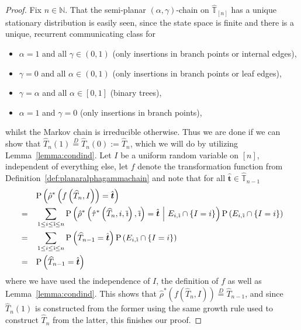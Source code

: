 \documentclass[a4paper, final]{amsart}
\theoremstyle{plain}
\theoremstyle{definition}
\newcommand{\tree}[1][t]{\boldsymbol{#1}}
\newcommand{\That}[1][T]{\widehat{#1}}
\newcommand{\Thatspace}[1][\T]{\widehat{\boldsymbol{#1}}} %
\newcommand{\T}{\mathbb{T}}
\DeclareMathOperator{\tildei}{\tilde{\textit{\i}}}
\newcommand{\deq}{\stackrel{D}{=}}
\renewcommand{\P}{\mathrm{P}}
\newcommand{\N}{\mathbb{N}}
\begin{document}
\begin{proof}
    Fix $n \in \N$.
    That the semi-planar $(\alpha, \gamma)$-chain on $\Thatspace_{[n]}$ has a unique stationary distribution is easily seen, since the state space is finite and there is a unique, recurrent communicating class for
    \begin{itemize}
        \item $\alpha = 1$ and all $\gamma \in (0,1)$ (only insertions in branch points or internal edges),
        \item $\gamma = 0$ and all $\alpha \in (0,1)$ (only insertions in branch points or leaf edges),
        \item $\gamma = \alpha$ and all $\alpha \in [0,1]$ (binary trees),
        \item $\alpha = 1$ and $\gamma = 0$ (only insertions in branch points),
    \end{itemize}
    whilst the Markov chain is irreducible otherwise.
    Thus we are done if we can show that $\That_n(1) \deq \That_n(0) := \That_n$, which we will do by utilizing Lemma~\ref{lemma:condind}.
    Let $I$ be a uniform random variable on $[n]$, independent of everything else, let $f$ denote the transformation function from Definition~\ref{def:planaralphagammachain} and note that for all $\hat{\tree} \in \Thatspace_{n-1}$ 
    \begin{align*}
      &\P \left( \hat{\rho}^* \left( f \left(\That_n, I \right) \right) = \hat{\tree} \right) \\
      =\quad &\sum_{1 \leq i \leq \tildei \leq n} \P \left( \hat{\rho}^* \left( \hat{\tau}^* \left( \That_n, i, \tildei \right), \tildei \right) = \hat{\tree} \ \middle \vert \ E_{i, \tildei} \cap \{ I = i \} \right) \P \left( E_{i, \tildei} \cap \{ I = i \} \right) \\
      =\quad &\sum_{1 \leq i \leq \tildei \leq n} \P \left( \That_{n-1} = \hat{\tree} \right) \P \left( E_{i, \tildei} \cap \{ I = i \} \right) \\
      =\quad &\P \left( \That_{n-1} = \hat{\tree} \right)
    \end{align*}
    where we have used the independence of $I$, the definition of $f$ as well as Lemma~\ref{lemma:condind}.
    This shows that $\hat{\rho}^* \left( f \left( \That_n, I \right) \right) \deq \That_{n-1}$, and since $\That_n(1)$ is constructed from the former using the same growth rule used to construct $\That_n$ from the latter, this finishes our proof.
\end{proof}
%
%
\end{document}
